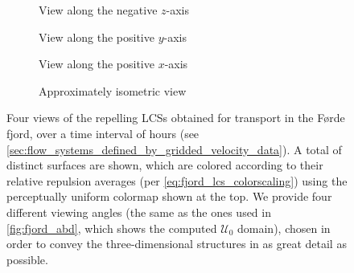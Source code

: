 \begin{figure}[htpb]
    \centering
    \vspace{10.0pt}

    \begin{subfigure}[b]{0.475\textwidth}
        \centering
        \caption[]{{\small View along the negative $z$-axis}}
        \label{fig:fjord_lcss_z}
    \end{subfigure}
    \begin{subfigure}[b]{0.475\textwidth}
        \centering
        \caption[]{{\small View along the positive $y$-axis}}
        \label{fig:fjord_lcss_y}
    \end{subfigure}

    \begin{subfigure}[b]{0.475\textwidth}
        \centering
        \caption[]{{\small View along the positive $x$-axis}}
        \label{fig:fjord_lcss_x}
    \end{subfigure}
    \begin{subfigure}[b]{0.475\textwidth}
        \centering
        \caption[]{{\small Approximately isometric view}}
        \label{fig:fjord_lcss_isometric}
    \end{subfigure}
    \caption[Four views of the repelling LCSs obtained for transport in the
    Førde fjord]
    {
        Four views of the repelling LCSs obtained for transport in the Førde
        fjord, over a time interval of  hours (see
        \cref{sec:flow_systems_defined_by_gridded_velocity_data}). A total
        of  distinct surfaces are shown, which are colored
        according to their relative repulsion averages (per
        \cref{eq:fjord_lcs_colorscaling}) using the perceptually uniform
        colormap shown at the top. We provide four different viewing angles
        (the same as the ones used in \cref{fig:fjord_abd}, which shows
        the computed $\mathcal{U}_{0}$ domain), chosen in order to convey
        the three-dimensional structures in as great detail as possible.
}
    \label{fig:fjord_lcss}
\end{figure}

